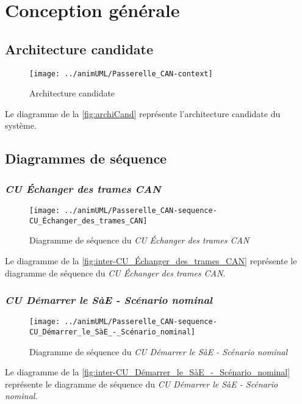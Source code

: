 
\section{Conception générale}

\newcommand\macroSuffix{}



\subsection{Architecture candidate}

\begin{figure}[H]
	\centering
	\texttt{[image: ../animUML/Passerelle\_CAN-context]}
	\caption{Architecture candidate}
	\label{fig:archiCand}
\end{figure}
Le diagramme de la \autoref{fig:archiCand} représente l'architecture candidate du système.


\subsection{Diagrammes de séquence}

\subsubsection{\emph{CU Échanger des trames CAN}}
\begin{figure}[H]
	\centering
	\texttt{[image: ../animUML/Passerelle\_CAN-sequence-CU\_Échanger\_des\_trames\_CAN]}
	\caption{Diagramme de séquence du \emph{CU Échanger des trames CAN}}
	\label{fig:inter-CU_Échanger_des_trames_CAN}
\end{figure}
Le diagramme de la \autoref{fig:inter-CU_Échanger_des_trames_CAN} représente le diagramme de séquence du \emph{CU Échanger des trames CAN}.


\subsubsection{\emph{CU Démarrer le SàE - Scénario nominal}}
\begin{figure}[H]
	\centering
	\texttt{[image: ../animUML/Passerelle\_CAN-sequence-CU\_Démarrer\_le\_SàE\_-\_Scénario\_nominal]}
	\caption{Diagramme de séquence du \emph{CU Démarrer le SàE - Scénario nominal}}
	\label{fig:inter-CU_Démarrer_le_SàE_-_Scénario_nominal}
\end{figure}
Le diagramme de la \autoref{fig:inter-CU_Démarrer_le_SàE_-_Scénario_nominal} représente le diagramme de séquence du \emph{CU Démarrer le SàE - Scénario nominal}.


